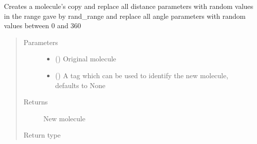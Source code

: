\documentclass[letterpaper,10pt,english]{sphinxmanual}
\begin{document}
\begin{fulllineitems}
\label{\detokenize{MolOpt.molecular:MolOpt.molecular.molecular.randomize}}
\sphinxAtStartPar
Creates a molecule’s copy and replace all distance parameters with random values in the range gave by rand\_range 
and replace all angle parameters with random values between 0 and 360
\begin{quote}\begin{description}
\item[{Parameters}] \leavevmode\begin{itemize}
\item {} 
\sphinxAtStartPar
{} ({\hyperref[\detokenize{MolOpt.molecular:MolOpt.molecular.molecular.Molecule}]{}}) \textendash{} Original molecule

\item {} 
\sphinxAtStartPar
{} (\sphinxstyleliteralemphasis{\sphinxupquote{, }}) \textendash{} A tag which can be used to identify the new molecule, defaults to None

\end{itemize}

\item[{Returns}] \leavevmode
\sphinxAtStartPar
New molecule

\item[{Return type}] \leavevmode
\sphinxAtStartPar
{\hyperref[\detokenize{MolOpt.molecular:MolOpt.molecular.molecular.Molecule}]{}}

\end{description}\end{quote}

\end{fulllineitems}

\end{document}
